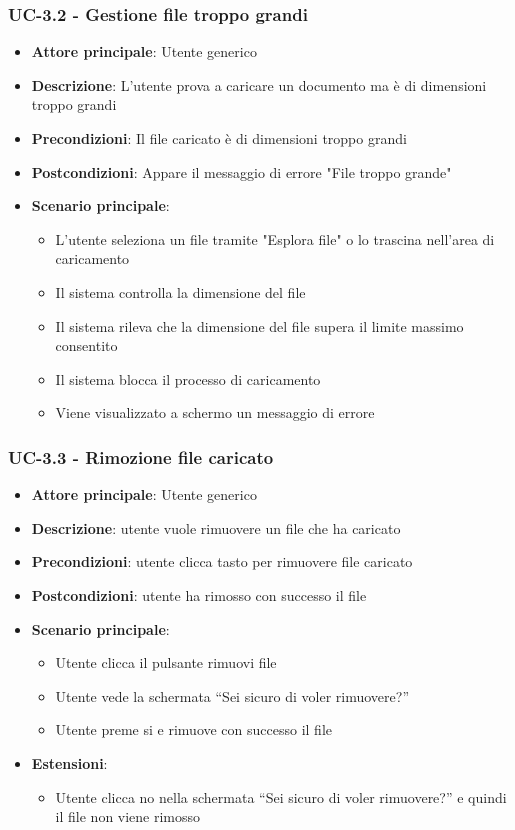 \documentclass[11pt,a4paper]{article}
\begin{document}
\subsubsection{UC-3.2 - Gestione file troppo grandi}
\begin{itemize}
    \item \textbf{Attore principale}: Utente generico
    \item \textbf{Descrizione}: L'utente prova a caricare un documento ma è di dimensioni troppo grandi
    \item \textbf{Precondizioni}: Il file caricato è di dimensioni troppo grandi
    \item \textbf{Postcondizioni}: Appare il messaggio di errore "File troppo grande"
    \item \textbf{Scenario principale}:
        \begin{itemize}
            \item L'utente seleziona un file tramite "Esplora file" o lo trascina nell'area di caricamento
            \item Il sistema controlla la dimensione del file
            \item Il sistema rileva che la dimensione del file supera il limite massimo consentito
            \item Il sistema blocca il processo di caricamento
            \item Viene visualizzato a schermo un messaggio di errore
        \end{itemize}
\end{itemize}

\subsubsection{UC-3.3 - Rimozione file caricato}
\begin{itemize}
    \item \textbf{Attore principale}: Utente generico
    \item \textbf{Descrizione}: utente vuole rimuovere un file che ha caricato
    \item \textbf{Precondizioni}: utente clicca tasto per rimuovere file caricato
    \item \textbf{Postcondizioni}: utente ha rimosso con successo il file
    \item \textbf{Scenario principale}:
        \begin{itemize}
            \item Utente clicca il pulsante rimuovi file
            \item Utente vede la schermata “Sei sicuro di voler rimuovere?”
            \item Utente preme si e rimuove con successo il file
        \end{itemize}
        \item \textbf{Estensioni}:
        \begin{itemize}
            \item Utente clicca no nella schermata “Sei sicuro di voler rimuovere?” e quindi il file non viene rimosso
        \end{itemize}
\end{itemize}
\end{document}
